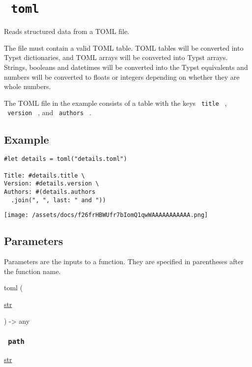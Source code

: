\section{\texorpdfstring{\texttt{\ toml\ }}{ toml }}\label{summary}

Reads structured data from a TOML file.

The file must contain a valid TOML table. TOML tables will be converted
into Typst dictionaries, and TOML arrays will be converted into Typst
arrays. Strings, booleans and datetimes will be converted into the Typst
equivalents and numbers will be converted to floats or integers
depending on whether they are whole numbers.

The TOML file in the example consists of a table with the keys
\texttt{\ title\ } , \texttt{\ version\ } , and \texttt{\ authors\ } .

\subsection{Example}\label{example}

\begin{verbatim}
#let details = toml("details.toml")

Title: #details.title \
Version: #details.version \
Authors: #(details.authors
  .join(", ", last: " and "))
\end{verbatim}

\texttt{[image: /assets/docs/f26frHBWUfr7bIomQ1qwWAAAAAAAAAAA.png]}

\subsection{\texorpdfstring{{ Parameters
}}{ Parameters }}\label{parameters}

\label{parameters-tooltip}
Parameters are the inputs to a function. They are specified in
parentheses after the function name.

{ toml } (

{ \href{/docs/reference/foundations/str/}{str} }

) -\textgreater{} { any }

\subsubsection{\texorpdfstring{\texttt{\ path\ }}{ path }}\label{parameters-path}

\href{/docs/reference/foundations/str/}{str}

